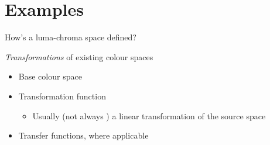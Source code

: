\documentclass[aspectratio=169,handout,usepdftitle=false]{fireshonks}
\begin{document}
\section{Examples}
\begin{frame}{How's a luma-chroma space defined?}
    \begin{center}
        \emph{Transformations} of existing colour spaces
    \end{center}
    \begin{itemize}
        \item Base colour space
        \item Transformation function
              \begin{itemize}
                  \item Usually (not always ) a linear transformation of the source space
              \end{itemize}
        \item Transfer functions, where applicable
    \end{itemize}
\end{frame}
\end{document}

